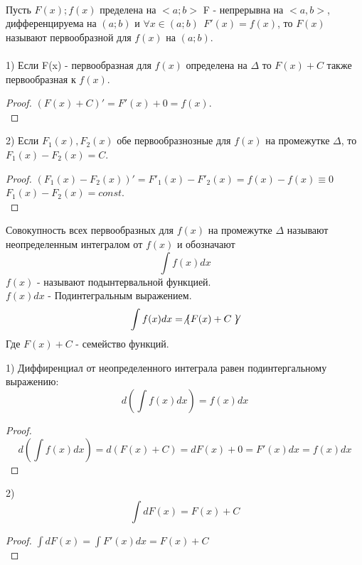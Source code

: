 \begin{center}
\end{center}

\\
Пусть $F(x); f(x)$ пределена на $<a;b>$ F - непрерывна на $<a,b>$,
дифференцируема на $(a;b)$ и $\forall x \in (a; b) ~~ F'(x) = f(x)$, то $F(x)$
называют первообразной для $f(x)$ на $(a;b)$.\\

\\
1) Если F(x) - первообразная для $f(x)$ определена на $\Delta$ то $F(x) + C$
также первообразная к $f(x)$.\\
\begin{proof}
  $(F(x) + C)' = F'(x) + 0 = f(x)$.\\
\end{proof}

2) Если $F_{1}(x), F_{2}(x)$ обе первообразнозные для $f(x)$ на промежутке
$\Delta$, то $F_{1}(x) - F_{2}(x) = C$.\\
\begin{proof}
  $(F_{1}(x) - F_{2}(x))' = F'_{1}(x) - F'_{2}(x) = f(x) - f(x) \equiv 0$\\
  $F_{1}(x) - F_{2}(x) = const$.\\
\end{proof}

\begin{defin}
  Совокупность всех первообразных для $f(x)$ на промежутке $\Delta$ называют
  неопределенным интегралом от $f(x)$ и обозначают
  \[\int f(x)dx\]
  $f(x)$ - называют подынтервальной функцией.\\
  $f(x)dx$ - Подинтегральным выражением.
  \[\int f(x)dx = \not\{ F(x) + C \not\} \]
  Где $F(x) + C$ - семейство функций.\\
\end{defin}

1) Диффиренциал от неопределенного интеграла равен подинтергальному выражению:
\[d \left ( \int f(x)dx \right ) = f(x)dx \]
\begin{proof}
  \[d \left ( \int f(x)dx \right ) = d(F(x) + C) = dF(x) + 0 = F'(x)dx
  = f(x)dx\]
\end{proof}

2)\[\int dF(x) = F(x) + C\]
\begin{proof}
  $\int dF(x) = \int F'(x)dx = F(x) + C$ \\
\end{proof}

